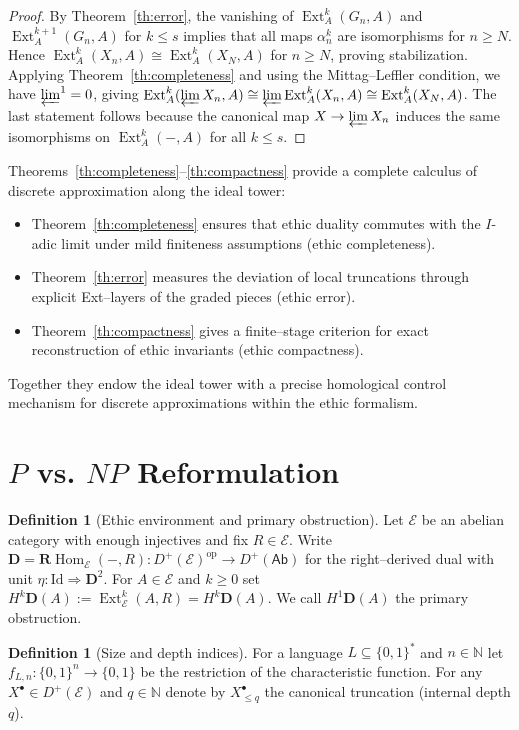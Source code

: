 \documentclass[12pt]{article}
\newcommand{\HD}[2]{H^{#1}\mathbf D(#2)} %
\newcommand{\Id}{\mathrm{Id}}
\newcommand{\E}{\mathcal{E}}
\newcommand{\Ab}{\mathsf{Ab}}
\newcommand{\Ext}{\operatorname{Ext}}
\newcommand{\op}{\mathrm{op}}
\newcommand{\RHom}{\mathbf{R}\!\operatorname{Hom}}
\newcommand{\Dplus}{D^{+}}
\theoremstyle{plain}
\theoremstyle{definition}
\newtheorem{definition}[theorem]{Definition}
\theoremstyle{remark}
\numberwithin{equation}{section}
\begin{document}
\begin{proof}
By Theorem~\ref{th:error}, the vanishing of
\(\Ext_A^{k}(G_n,A)\) and \(\Ext_A^{k+1}(G_n,A)\) for \(k\le s\)
implies that all maps \(\alpha_{n}^{k}\) are isomorphisms for \(n\ge N\).
Hence \(\Ext_A^{k}(X_n,A)\cong\Ext_A^{k}(X_N,A)\) for \(n\ge N\),
proving stabilization.
Applying Theorem~\ref{th:completeness} and using the Mittag–Leffler
condition, we have \(\varprojlim^1=0\), giving
\(\Ext_A^{k}(\varprojlim X_n,A)\cong \varprojlim \Ext_A^{k}(X_n,A)
\cong \Ext_A^{k}(X_N,A)\).
The last statement follows because the canonical map \(X\to\varprojlim X_n\)
induces the same isomorphisms on \(\Ext_A^{k}(-,A)\) for all \(k\le s\).
\end{proof}

Theorems~\ref{th:completeness}–\ref{th:compactness} provide a complete calculus of discrete approximation along the ideal tower:
\begin{itemize}[leftmargin=1.2em]
\item Theorem~\ref{th:completeness} ensures that ethic duality commutes with the \(I\)-adic limit under mild finiteness assumptions (ethic completeness).
\item Theorem~\ref{th:error} measures the deviation of local truncations through explicit Ext–layers of the graded pieces (ethic error).
\item Theorem~\ref{th:compactness} gives a finite–stage criterion for exact reconstruction of ethic invariants (ethic compactness).
\end{itemize}
Together they endow the ideal tower with a precise homological control mechanism for discrete approximations within the ethic formalism.

\section{\texorpdfstring{$P$ vs. $NP$}{P vs. NP} Reformulation}

\begin{definition}[Ethic environment and primary obstruction]
Let \(\E\) be an abelian category with enough injectives and fix \(R\in \E\).
Write \(\mathbf D=\RHom_{\E}(-,R):\Dplus(\E)^{\op}\!\to\Dplus(\Ab)\) for the right–derived dual with unit \(\eta:\Id\Rightarrow \mathbf D^{2}\).
For \(A\in \E\) and \(k\ge 0\) set \(\HD{k}{A}:=\Ext^{k}_{\E}(A,R)=H^{k}\mathbf D(A)\).
We call \(\HD{1}{A}\) the primary obstruction.
\end{definition}

\begin{definition}[Size and depth indices]
For a language \(L\subseteq\{0,1\}^{*}\) and \(n\in\mathbb N\) let \(f_{L,n}:\{0,1\}^{n}\to\{0,1\}\) be the restriction of the characteristic function.
For any \(X^{\bullet}\in \Dplus(\E)\) and \(q\in\mathbb N\) denote by \(X^{\bullet}_{\le q}\) the canonical truncation (internal depth \(q\)).
\end{definition}
\end{document}
